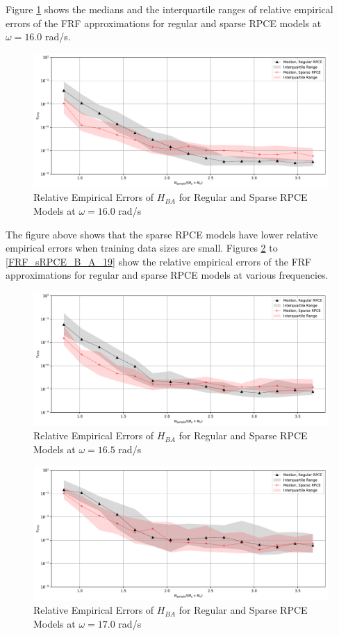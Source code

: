 Figure \ref{FRF_sRPCE_B_A_16} shows the medians and the interquartile ranges of relative empirical errors of the FRF approximations for regular and sparse RPCE models at $\omega=16.0$ rad/s.
\begin{figure}[H]
    \centering
    \includegraphics[width=1.0\textwidth]{
        plots/surrogate/plot_1_B_16.pdf
    }
    \caption{%
        Relative Empirical Errors of $H_{BA}$ for Regular and Sparse RPCE Models at $\omega=16.0$ rad/s
    }
    \label{FRF_sRPCE_B_A_16}
\end{figure}
The figure above shows that the sparse RPCE models have lower relative empirical errors when training data sizes are small.
Figures \ref{FRF_sRPCE_B_A_17} to \ref{FRF_sRPCE_B_A_19} show the relative empirical errors of the FRF approximations for regular and sparse RPCE models at various frequencies.
\begin{figure}[H]
    \centering
    \includegraphics[width=1.0\textwidth]{
        plots/surrogate/plot_1_B_17.pdf
    }
    \caption{%
        Relative Empirical Errors of $H_{BA}$ for Regular and Sparse RPCE Models at $\omega=16.5$ rad/s
    }
    \label{FRF_sRPCE_B_A_17}
\end{figure}
\begin{figure}[H]
    \centering
    \includegraphics[width=1.0\textwidth]{
        plots/surrogate/plot_1_B_18.pdf
    }
    \caption{%
        Relative Empirical Errors of $H_{BA}$ for Regular and Sparse RPCE Models at $\omega=17.0$ rad/s
    }
    \label{FRF_sRPCE_B_A_18}
\end{figure}
